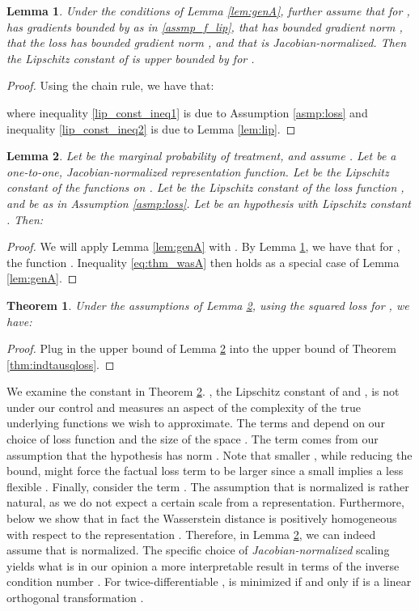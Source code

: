 \documentclass{article}
\newtheorem{thmappthm}{Theorem}
\newtheorem{thmapplem}{Lemma}
\begin{document}
\begin{thmapplem}\label{lem:errlip}
Under the conditions of Lemma \ref{lem:genA}, further assume that for ,  has gradients bounded by  as in \ref{assmp_f_lip}, that  has bounded gradient norm , that the loss  has bounded gradient norm , and that  is Jacobian-normalized. Then the Lipschitz constant of  is upper bounded by  for .
\end{thmapplem}
\begin{proof}
Using the chain rule, we have that:

where inequality \ref{lip_const_ineq1} is due to Assumption \ref{asmp:loss} and inequality \ref{lip_const_ineq2} is due to Lemma \ref{lem:lip}.
\end{proof}



\begin{thmapplem}\label{thm:wasA}
Let  be the marginal probability of treatment, and assume . Let  be a one-to-one, Jacobian-normalized representation function. Let  be the Lipschitz constant of the functions  on . Let  be the Lipschitz constant of the loss function , and  be as in Assumption \ref{asmp:loss}. Let  be an hypothesis with Lipschitz constant .
Then:

\end{thmapplem}

\begin{proof}
We will apply Lemma \ref{lem:genA} with . By Lemma \ref{lem:errlip}, we have that for , the function . Inequality \eqref{eq:thm_wasA} then holds as a special case of Lemma \ref{lem:genA}.
\end{proof}
\begin{thmappthm}Under the assumptions of Lemma \ref{thm:wasA}, using the squared loss for , we have:

\end{thmappthm}
\begin{proof}
Plug in the upper bound of Lemma \ref{thm:wasA} into the upper bound of Theorem \ref{thm:indtausqloss}.
\end{proof}


We examine the constant  in Theorem \ref{thm:wasA}. , the Lipschitz constant of  and , is not under our control and measures an aspect of the complexity of the true underlying functions we wish to approximate. The terms  and  depend on our choice of loss function and the size of the space . The term  comes from our assumption that the hypothesis  has norm . Note that smaller , while reducing the bound, might force the factual loss term  to be larger since a small  implies a less flexible . Finally, consider the term .
The assumption that  is normalized is rather natural, as we do not expect a certain scale from a representation. Furthermore, below we show that in fact the Wasserstein distance is positively homogeneous with respect to the representation . Therefore, in Lemma \ref{thm:wasA}, we can indeed assume that  is normalized. The specific choice of \emph{Jacobian-normalized} scaling yields what is in our opinion a more interpretable result in terms of the inverse condition number . For twice-differentiable ,  is minimized if and only if  is a linear orthogonal transformation \cite{mathover}. 
\end{document}
